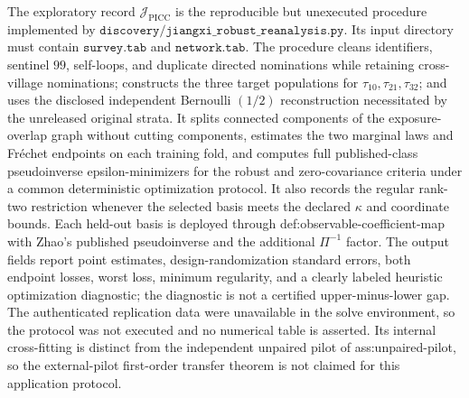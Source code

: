 The exploratory record \(\mathcal J_{\mathrm{PICC}}\) is the reproducible but unexecuted procedure implemented by \(\texttt{discovery/jiangxi\_robust\_reanalysis.py}\).  Its input directory must contain \(\texttt{survey.tab}\) and \(\texttt{network.tab}\).  The procedure cleans identifiers, sentinel \(99\), self-loops, and duplicate directed nominations while retaining cross-village nominations; constructs the three target populations for \(\tau_{10},\tau_{21},\tau_{32}\); and uses the disclosed independent Bernoulli \((1/2)\) reconstruction necessitated by the unreleased original strata.  It splits connected components of the exposure-overlap graph without cutting components, estimates the two marginal laws and Fr\'echet endpoints on each training fold, and computes full published-class pseudoinverse epsilon-minimizers for the robust and zero-covariance criteria under a common deterministic optimization protocol.  It also records the regular rank-two restriction whenever the selected basis meets the declared \(\kappa\) and coordinate bounds.  Each held-out basis is deployed through def:observable-coefficient-map with Zhao's published pseudoinverse and the additional \(\Pi^{-1}\) factor.  The output fields report point estimates, design-randomization standard errors, both endpoint losses, worst loss, minimum regularity, and a clearly labeled heuristic optimization diagnostic; the diagnostic is not a certified upper-minus-lower gap.  The authenticated replication data were unavailable in the solve environment, so the protocol was not executed and no numerical table is asserted.  Its internal cross-fitting is distinct from the independent unpaired pilot of ass:unpaired-pilot, so the external-pilot first-order transfer theorem is not claimed for this application protocol.